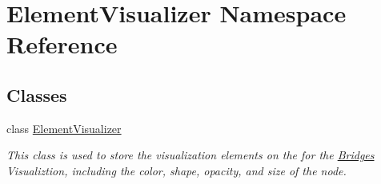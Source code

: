 \hypertarget{namespace_element_visualizer}{}\section{Element\+Visualizer Namespace Reference}
\label{namespace_element_visualizer}
\subsection*{Classes}
\begin{DoxyCompactItemize}
\item 
class \hyperlink{class_element_visualizer_1_1_element_visualizer}{Element\+Visualizer}
\begin{DoxyCompactList}\small\item\em This class is used to store the visualization elements on the for the \hyperlink{namespace_bridges}{Bridges} Visualiztion, including the color, shape, opacity, and size of the node. \end{DoxyCompactList}\end{DoxyCompactItemize}
